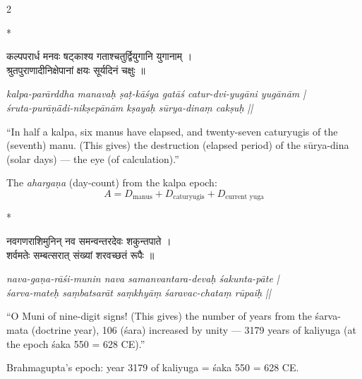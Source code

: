 \documentclass[11pt,a4paper]{article}
\newcommand{\dev}[1]{{\devanagarifont #1}}
\theoremstyle{definition}
\begin{document}
\begin{paracol}{2}

\switchcolumn[0]*\noindent
\begin{tcolorbox}[colback=sktbg,colframe=vertrule,boxrule=0.5pt,arc=3pt,title={\small\bfseries Verse 26}]
\dev{कल्पपरार्ध मनवः षट्काश्य गताश्चतुर्द्वियुगानि युगानाम् ।\\
श्रुतपुराणादीनिक्षेपानां क्षयः सूर्यदिनं चक्षुः ॥}
\end{tcolorbox}

\switchcolumn\noindent
\begin{tcolorbox}[back=transbg,colframe=vertrule!60,boxrule=0.5pt,arc=3pt,title={\small\bfseries Translation 26}]
\textit{kalpa-par\=arddha manava\d{h} \d{s}a\d{t}-k\=a\'{s}ya gat\=a\'{s} catur-dvi-yug\=ani yug\=an\=am |\\
\'{s}ruta-pur\=a\d{n}\=\=adi-nik\d{s}ep\=an\=am k\d{s}aya\d{h} s\=urya-dina\d{m} cak\d{s}u\d{h} ||}

``In half a kalpa, six manus have elapsed, and twenty-seven caturyugis of the (seventh) manu. (This gives) the destruction (elapsed period) of the s\=urya-dina (solar days) --- the eye (of calculation).''

The \textit{aharga\d{n}a} (day-count) from the kalpa epoch:
\[
A = D_{\text{manus}} + D_{\text{caturyugis}} + D_{\text{current yuga}}
\]
\end{tcolorbox}

\switchcolumn[0]*\noindent
\begin{tcolorbox}[colback=sktbg,colframe=vertrule,boxrule=0.5pt,arc=3pt,title={\small\bfseries Verse 27}]
\dev{नवगणराशिमुनिन् नव समन्वन्तरदेवः शकुन्तपाते ।\\
शर्वमतेः सम्बत्सरात् संख्यां शरवच्छतं रूपैः ॥}
\end{tcolorbox}

\switchcolumn\noindent
\begin{tcolorbox}[colback=transbg,colframe=vertrule!60,boxrule=0.5pt,arc=3pt,title={\small\bfseries Translation 27}]
\textit{nava-ga\d{n}a-r\=a\'{s}i-munin nava samanvantara-deva\d{h} \'{s}akunta-p\=ate |\\
\'{s}arva-mate\d{h} sa\d{m}batsar\=at sa\d{m}khy\=a\d{m} \'{s}aravac-chata\d{m} r\=upai\d{h} ||}

``O Muni of nine-digit signs! (This gives) the number of years from the \'{s}arva-mata (doctrine year), 106 (\'{s}ara) increased by unity --- 3179 years of kaliyuga (at the epoch \'{s}aka 550 = 628 CE).''

Brahmagupta's epoch: year 3179 of kaliyuga = \'{s}aka 550 = 628 CE.
\end{tcolorbox}

\end{paracol}
\end{document}
